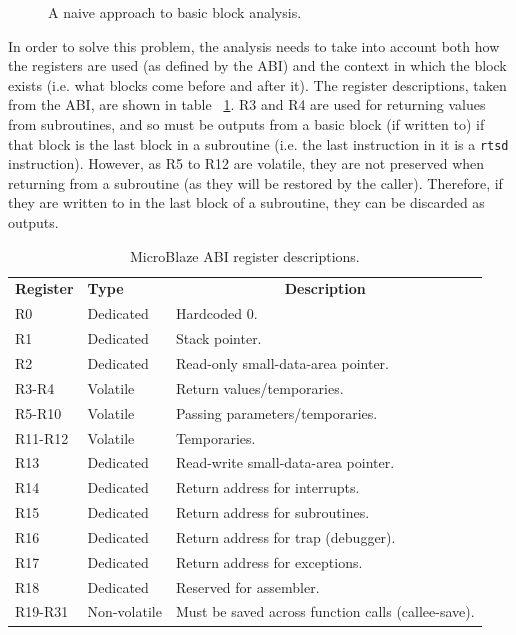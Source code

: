\documentclass{UoYCSproject}
\newenvironment{monospace}{\ttfamily\small}{\par}
\begin{document}
\begin{figure}[H]
  \begin{center}
    \begin{minipage}{0.5\linewidth}
      \begin{monospace}
      
      \end{monospace}
    \end{minipage}
  \end{center}

  \caption{A naive approach to basic block analysis.}
  \label{fig:analysisNaiveApproach}
\end{figure}

In order to solve this problem, the analysis needs to take into account both how the registers are used (as defined by the
ABI) and the context in which the block exists (i.e. what blocks come before and after it).
The register descriptions, taken from the ABI, are shown in table ~\ref{table:abi}. R3 and R4 are used for returning values from
subroutines, and so must be outputs from a basic block (if written to) if that block is the last block in a subroutine
(i.e. the last instruction in it is a \texttt{rtsd} instruction). However, as R5 to R12 are volatile, they are not preserved
when returning from a subroutine (as they will be restored by the caller). Therefore, if they are written to in the last block
of a subroutine, they can be discarded as outputs.

\begin{table}[H]
\centering
\begin{tabular}{ |p{2cm}|p{3cm}|p{8cm}| }
\textbf{Register} & \textbf{Type} & \multicolumn{1}{c}{\textbf{Description}} \\
R0       & Dedicated    & Hardcoded 0. \\[0.05cm]
R1       & Dedicated    & Stack pointer. \\[0.05cm]
R2       & Dedicated    & Read-only small-data-area pointer. \\[0.05cm]
R3-R4    & Volatile     & Return values/temporaries. \\[0.05cm]
R5-R10   & Volatile     & Passing parameters/temporaries. \\[0.05cm]
R11-R12  & Volatile     & Temporaries. \\[0.05cm]
R13      & Dedicated    & Read-write small-data-area pointer. \\[0.05cm]
R14      & Dedicated    & Return address for interrupts. \\[0.05cm]
R15      & Dedicated    & Return address for subroutines. \\[0.05cm]
R16      & Dedicated    & Return address for trap (debugger). \\[0.05cm]
R17      & Dedicated    & Return address for exceptions. \\[0.05cm]
R18      & Dedicated    & Reserved for assembler. \\[0.05cm]
R19-R31  & Non-volatile & Must be saved across function calls (callee-save).
\end{tabular}
\caption{MicroBlaze ABI register descriptions.}
\label{table:abi}
\end{table}
\end{document}
